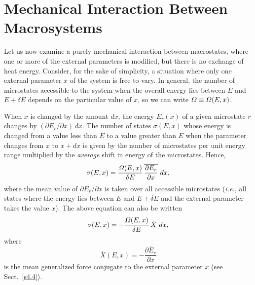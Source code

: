 \section{Mechanical Interaction Between Macrosystems}
Let us now examine a purely mechanical interaction between macrostates, where one
or more of the external parameters is modified, but there is no exchange of 
heat energy. Consider, for the sake of simplicity, a situation where only
one external parameter $x$ of the system is free to vary. 
In general, the number of microstates
accessible to the system when the overall energy lies between $E$ and $E+\delta E$
depends  on the particular value of $x$, so we can write 
${\mit\Omega} \equiv {\mit\Omega}(E, x)$.

When $x$ is changed by the amount $dx$, the energy $E_r(x)$ of a given
microstate        
$r$ changes by $(\partial E_r/\partial x)\, dx$. The number of states
$\sigma(E,x)$ whose energy is changed from a value less than $E$ to a value
greater than $E$ when the parameter changes from $x$ to $x+dx$ is given by
the number of microstates per unit energy range multiplied by the {\em average}
shift in energy  of the microstates. Hence,
\begin{equation}
\sigma (E,x) = \frac{{\mit\Omega}(E,x)}{\delta E}\,
\overline{\frac{\partial E_r}{\partial x}}\,
\,dx,
\end{equation}
where the mean value of $\partial E_r/\partial x$ is taken over all accessible
microstates  ({\em i.e.}, all states where the energy lies between $E$ and $E+\delta E$ and
the external parameter takes the value $x$). The above equation can also be written
\begin{equation}
\sigma (E,x) = - \frac{{\mit\Omega}(E,x)}{\delta E}\,
\bar{X}\,\,dx,\label{e5.32}
\end{equation}
where 
\begin{equation}
\bar{X}(E,x) = -\overline{\frac{\partial E_r}{\partial x}}
\end{equation}
is the mean generalized force conjugate to the external parameter $x$ 
(see Sect.~\ref{s4.4}).

